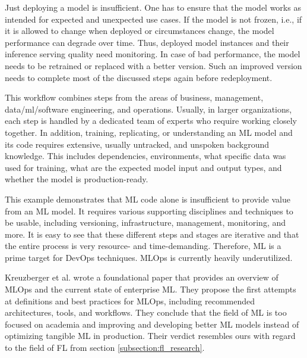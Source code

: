 Just deploying a model is insufficient.
One has to ensure that the model works as intended for expected and unexpected use cases.
If the model is not frozen, i.e., if it is allowed to change when deployed or circumstances change, the model performance can degrade over time.
Thus, deployed model instances and their inference serving quality need monitoring.
In case of bad performance, the model needs to be retrained or replaced with a better version.
Such an improved version needs to complete most of the discussed steps again before redeployment.

This workflow combines steps from the areas of business, management, data/ml/software engineering, and operations.
Usually, in larger organizations, each step is handled by a dedicated team of experts who require working 
closely together.
In addition, training, replicating, or understanding an ML model and its code
requires extensive, usually untracked, and unspoken background knowledge.
This includes dependencies, environments, what specific data was used for training,
what are the expected model input and output types, and whether the model is production-ready.

This example demonstrates that ML code alone is insufficient to provide value from an ML model.
It requires various supporting disciplines and techniques to be usable,
including versioning, infrastructure, management, monitoring, and more.
It is easy to see that these different steps and stages are iterative
and that the entire process is very resource- and time-demanding.
Therefore, ML is a prime target for DevOps techniques.
MLOps is currently heavily underutilized.

Kreuzberger et al. wrote a foundational paper \cite{paper:mlops}
that provides an overview of MLOps and the current state of enterprise ML.
They propose the first attempts at definitions and best practices for MLOps, including 
recommended architectures, tools, and workflows.
They conclude that the field of ML is too focused on academia and improving and developing better ML models
instead of optimizing tangible ML in production.
Their verdict resembles ours with regard to the field of FL from section \ref{subsection:fl_research}.
